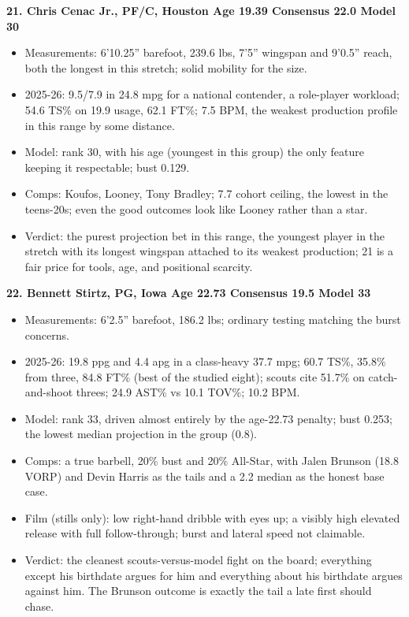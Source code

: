 \documentclass[
  10pt,
]{article}
\providecommand{\tightlist}{%
  \setlength{\itemsep}{0pt}\setlength{\parskip}{0pt}}
\begin{document}
\textbf{21. Chris Cenac Jr., PF/C, Houston \textbar{} Age 19.39 \textbar{}
Consensus 22.0 \textbar{} Model 30}

\begin{itemize}
\tightlist
\item
  Measurements: 6'10.25'' barefoot, 239.6 lbs, 7'5'' wingspan and 9'0.5'' reach,
  both the longest in this stretch; solid mobility for the size.
\item
  2025-26: 9.5/7.9 in 24.8 mpg for a national contender, a role-player workload;
  54.6 TS\% on 19.9 usage, 62.1 FT\%; 7.5 BPM, the weakest production profile in
  this range by some distance.
\item
  Model: rank 30, with his age (youngest in this group) the only feature keeping
  it respectable; bust 0.129.
\item
  Comps: Koufos, Looney, Tony Bradley; 7.7 cohort ceiling, the lowest in the
  teens-20s; even the good outcomes look like Looney rather than a star.
\item
  Verdict: the purest projection bet in this range, the youngest player in the
  stretch with its longest wingspan attached to its weakest production; 21 is a
  fair price for tools, age, and positional scarcity.
\end{itemize}

\textbf{22. Bennett Stirtz, PG, Iowa \textbar{} Age 22.73 \textbar{} Consensus
19.5 \textbar{} Model 33}

\begin{itemize}
\tightlist
\item
  Measurements: 6'2.5'' barefoot, 186.2 lbs; ordinary testing matching the burst
  concerns.
\item
  2025-26: 19.8 ppg and 4.4 apg in a class-heavy 37.7 mpg; 60.7 TS\%, 35.8\%
  from three, 84.8 FT\% (best of the studied eight); scouts cite 51.7\% on
  catch-and-shoot threes; 24.9 AST\% vs 10.1 TOV\%; 10.2 BPM.
\item
  Model: rank 33, driven almost entirely by the age-22.73 penalty; bust 0.253;
  the lowest median projection in the group (0.8).
\item
  Comps: a true barbell, 20\% bust and 20\% All-Star, with Jalen Brunson (18.8
  VORP) and Devin Harris as the tails and a 2.2 median as the honest base case.
\item
  Film (stills only): low right-hand dribble with eyes up; a visibly high
  elevated release with full follow-through; burst and lateral speed not
  claimable.
\item
  Verdict: the cleanest scouts-versus-model fight on the board; everything
  except his birthdate argues for him and everything about his birthdate argues
  against him. The Brunson outcome is exactly the tail a late first should
  chase.
\end{itemize}
\end{document}

